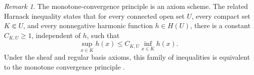 \documentclass{amsart}
\newtheorem{lemma}[theorem]{Lemma}
\theoremstyle{definition}
\theoremstyle{remark}
\newtheorem{remark}[definition]{Remark}
\numberwithin{equation}{section}
\begin{document}
	
	\begin{remark}%
		The monotone-convergence principle is an axiom scheme. The related Harnack inequality states that for every connected open set $U$, every compact set
		$K\Subset U$, and every nonnegative harmonic function $h\in H(U)$, there is a constant $C_{K,U}\ge1$, independent of $h$, such that
		$$
		\sup_{x\in K}h(x)
		\le
		C_{K,U}\inf_{x\in K}h(x).
		$$
		Under the sheaf and regular basis axioms, this family of inequalities is equivalent to the monotone convergence principle \cite[Theorem 1]{LW1965axiomatic}.
	\end{remark}
	
	
	
	
	
	
	
	
\end{document}
